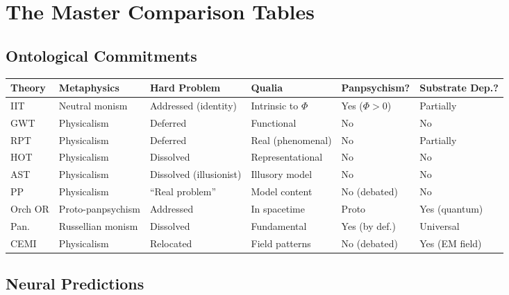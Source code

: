 \documentclass[11pt,a4paper]{report}
\begin{document}
\chapter{The Master Comparison Tables}

\section{Ontological Commitments}

\begin{center}
\renewcommand{\arraystretch}{1.35}
\small
\begin{tabular}{>{\raggedright}p{1.4cm} >{\raggedright}p{2.2cm} >{\raggedright}p{2.5cm} >{\raggedright}p{2.2cm} >{\raggedright}p{2.0cm} >{\raggedright\arraybackslash}p{2.2cm}}
  \toprule
  \textbf{Theory} & \textbf{Metaphysics} & \textbf{Hard Problem} & \textbf{Qualia} & \textbf{Panpsychism?} & \textbf{Substrate Dep.?} \\
  \midrule
  IIT & Neutral monism & Addressed (identity) & Intrinsic to $\Phi$ & Yes ($\Phi > 0$) & Partially \\
  GWT & Physicalism & Deferred & Functional & No & No \\
  RPT & Physicalism & Deferred & Real (phenomenal) & No & Partially \\
  HOT & Physicalism & Dissolved & Representational & No & No \\
  AST & Physicalism & Dissolved (illusionist) & Illusory model & No & No \\
  PP & Physicalism & ``Real problem'' & Model content & No (debated) & No \\
  Orch OR & Proto-panpsychism & Addressed & In spacetime & Proto & Yes (quantum) \\
  Pan. & Russellian monism & Dissolved & Fundamental & Yes (by def.) & Universal \\
  CEMI & Physicalism & Relocated & Field patterns & No (debated) & Yes (EM field) \\
  \bottomrule
\end{tabular}
\end{center}

\section{Neural Predictions}
\end{document}
